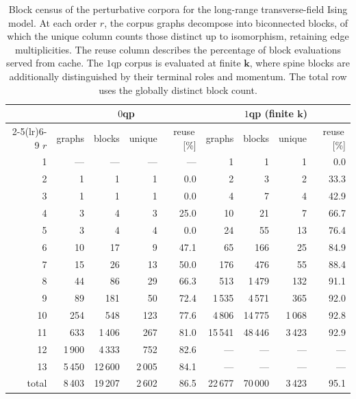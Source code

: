 \documentclass[]{amsart}
\numberwithin{mythm}{section}
\begin{document}
\begin{table}[t]
\centering
{\setlength{\tabcolsep}{4pt}\scriptsize
\begin{tabular}{@{}r rrrr rrrr@{}}
\toprule
& \multicolumn{4}{c}{$0$qp} & \multicolumn{4}{c}{$1$qp (finite $\bm k$)}\\
\cmidrule(lr){2-5}\cmidrule(lr){6-9}
$r$ & graphs & blocks & unique & reuse\,[\%]
    & graphs & blocks & unique & reuse\,[\%]\\
\midrule
 1 & ---     & ---      & ---     & ---  & 1       & 1        & 1      & 0.0 \\
 2 & 1       & 1        & 1       & 0.0  & 2       & 3        & 2      & 33.3\\
 3 & 1       & 1        & 1       & 0.0  & 4       & 7        & 4      & 42.9\\
 4 & 3       & 4        & 3       & 25.0 & 10      & 21       & 7      & 66.7\\
 5 & 3       & 4        & 4       & 0.0  & 24      & 55       & 13     & 76.4\\
 6 & 10      & 17       & 9       & 47.1 & 65      & 166      & 25     & 84.9\\
 7 & 15      & 26       & 13      & 50.0 & 176     & 476      & 55     & 88.4\\
 8 & 44      & 86       & 29      & 66.3 & 513     & 1\,479   & 132    & 91.1\\
 9 & 89      & 181      & 50      & 72.4 & 1\,535  & 4\,571   & 365    & 92.0\\
10 & 254     & 548      & 123     & 77.6 & 4\,806  & 14\,775  & 1\,068 & 92.8\\
11 & 633     & 1\,406   & 267     & 81.0 & 15\,541 & 48\,446  & 3\,423 & 92.9\\
12 & 1\,900  & 4\,333   & 752     & 82.6 & ---     & ---      & ---    & --- \\
13 & 5\,450  & 12\,600  & 2\,005  & 84.1 & ---     & ---      & ---    & --- \\
\midrule
total & 8\,403 & 19\,207 & 2\,602 & 86.5 & 22\,677 & 70\,000 & 3\,423 & 95.1\\
\bottomrule
\end{tabular}\vspace*{.1cm}}
\caption{Block census of the perturbative corpora for the long-range transverse-field Ising model. At each order $r$, the corpus graphs decompose into biconnected blocks, of which the unique column counts those distinct up to isomorphism, retaining edge multiplicities. The reuse column describes the percentage of block evaluations served from cache. The $1$qp corpus is evaluated at finite $\bm k$, where spine blocks are additionally distinguished by their terminal roles and momentum. The total row uses the globally distinct block count.}
\label{tab:block-census}
\end{table}
\end{document}
